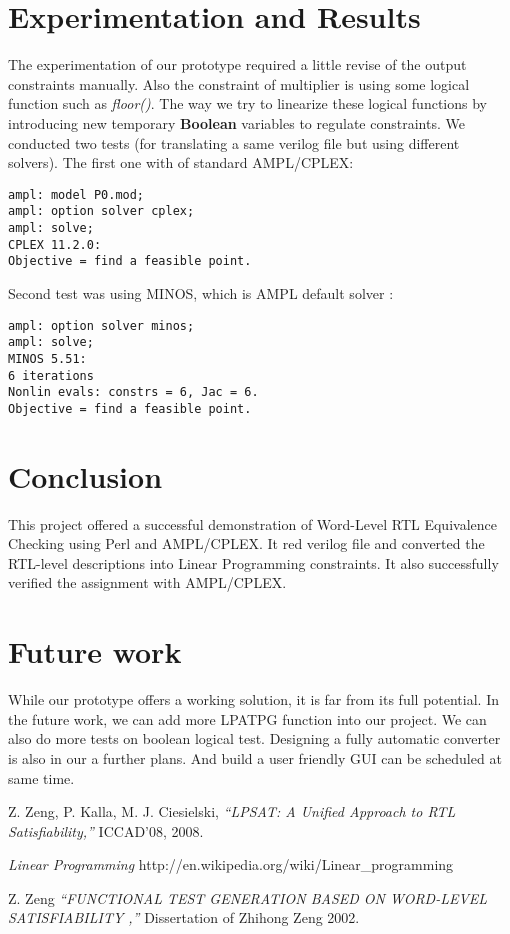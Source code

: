 \documentclass[conference,11pt]{IEEEtran}
\begin{document}
\section{Experimentation and Results}
The experimentation of our prototype required a little revise of the output constraints manually. Also the constraint of multiplier is using some logical function such as \emph{floor()}. The way we try to linearize these logical functions by introducing new temporary \textbf {Boolean} variables to regulate constraints. We conducted two tests (for translating a same verilog file but using different solvers). The first one with of standard AMPL/CPLEX:
\begin{verbatim}
ampl: model P0.mod;
ampl: option solver cplex;
ampl: solve;
CPLEX 11.2.0:
Objective = find a feasible point.
\end{verbatim}

 Second test was using MINOS, which is AMPL default solver :
\begin{verbatim}
ampl: option solver minos;
ampl: solve;
MINOS 5.51:
6 iterations
Nonlin evals: constrs = 6, Jac = 6.
Objective = find a feasible point.
\end{verbatim}





\section{Conclusion}
This project offered a successful demonstration of Word-Level RTL Equivalence Checking using Perl and AMPL/CPLEX. It red verilog file and converted the RTL-level descriptions into Linear Programming constraints. It also successfully verified the assignment with  AMPL/CPLEX.


\section{Future work}
While our prototype offers a working solution, it is far from its full potential. In the future work, we can add more LPATPG function into our project. We can also do more tests on boolean logical test. Designing a fully automatic converter is also in our a further plans. And build a user friendly GUI can be scheduled at same time.



\begin{thebibliography}{1}



Z. Zeng, P. Kalla, M. J. Ciesielski, \emph{``LPSAT: A Uniﬁed Approach to RTL Satisﬁability,” } ICCAD'08, 2008.

\emph{Linear Programming} http://en.wikipedia.org/wiki/Linear\_programming

Z. Zeng \emph{``FUNCTIONAL TEST GENERATION BASED ON WORD-LEVEL SATISFIABILITY ,” } Dissertation of Zhihong Zeng 2002.


\end{thebibliography}


\end{document}
